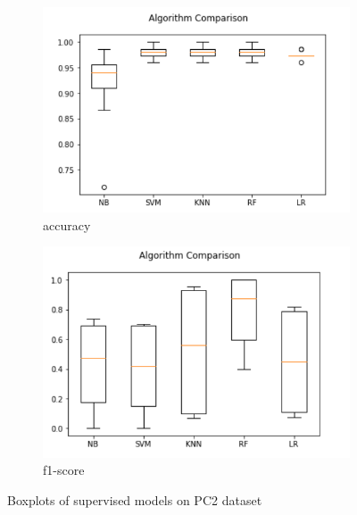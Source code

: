 \begin{figure}[h!]
  \centering
  \begin{subfigure}[b]{0.4\linewidth}
    \includegraphics[width=\linewidth]{report/PC2.png}
    \caption{accuracy}
  \end{subfigure}
  \begin{subfigure}[b]{0.4\linewidth}
    \includegraphics[width=\linewidth]{report/PC2_f.png}
    \caption{f1-score}
  \end{subfigure}
  \caption{Boxplots of supervised models on PC2 dataset}
\end{figure}

